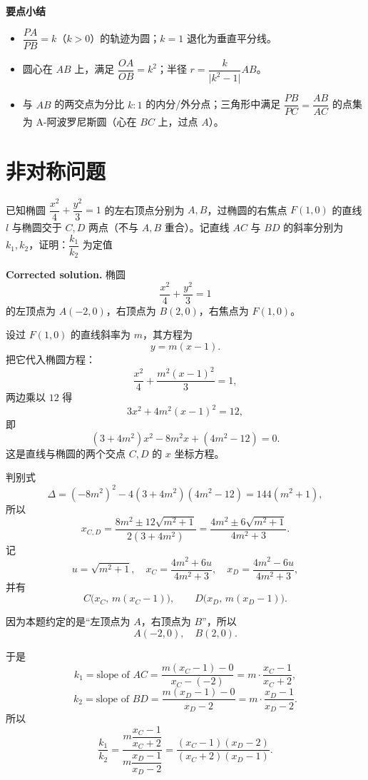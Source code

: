 \documentclass{article}
\begin{document}
   \textbf{要点小结}
   \begin{itemize}
   	\item \(\dfrac{PA}{PB}=k\)（\(k>0\)）的轨迹为圆；\(k=1\) 退化为垂直平分线。
   	\item 圆心在 \(AB\) 上，满足 \(\dfrac{OA}{OB}=k^2\)；半径 \(r=\dfrac{k}{\lvert k^2-1\rvert}AB\)。
   	\item 与 \(AB\) 的两交点为分比 \(k:1\) 的内分/外分点；三角形中满足 \(\dfrac{PB}{PC}=\dfrac{AB}{AC}\) 的点集为 A-阿波罗尼斯圆（心在 \(BC\) 上，过点 \(A\)）。
   \end{itemize}
   
   \section{非对称问题}
   
   已知椭圆 \(\dfrac{x^{2}}{4}+\dfrac{y^{2}}{3}=1\) 的左右顶点分别为 \(A,B\)，过椭圆的右焦点 \(F(1,0)\) 的直线 \(l\) 与椭圆交于 \(C,D\) 两点（不与 \(A,B\) 重合）。记直线 \(AC\) 与 \(BD\) 的斜率分别为 \(k_{1},k_{2}\)，证明：\(\dfrac{k_{1}}{k_{2}}\) 为定值
   
   \textbf{Corrected solution.}
   椭圆
   \[
   \frac{x^{2}}{4}+\frac{y^{2}}{3}=1
   \]
   的左顶点为 \(A(-2,0)\)，右顶点为 \(B(2,0)\)，右焦点为 \(F(1,0)\)。
   
   设过 \(F(1,0)\) 的直线斜率为 \(m\)，其方程为
   \[
   y = m(x-1).
   \]
   把它代入椭圆方程：
   \[
   \frac{x^{2}}{4} + \frac{m^{2}(x-1)^{2}}{3} = 1,
   \]
   两边乘以 \(12\) 得
   \[
   3x^{2} + 4m^{2}(x-1)^{2} = 12,
   \]
   即
   \[
   (3+4m^{2})x^{2} - 8m^{2}x + (4m^{2}-12) = 0. \tag{1}
   \]
   这是直线与椭圆的两个交点 \(C,D\) 的 \(x\) 坐标方程。
   
   判别式
   \[
   \Delta = (-8m^{2})^{2} - 4(3+4m^{2})(4m^{2}-12)
   = 144(m^{2}+1),
   \]
   所以
   \[
   x_{C,D}
   = \frac{8m^{2} \pm 12\sqrt{m^{2}+1}}{2(3+4m^{2})}
   = \frac{4m^{2} \pm 6\sqrt{m^{2}+1}}{4m^{2}+3}.
   \]
   记
   \[
   u = \sqrt{m^{2}+1}, \quad
   x_C = \frac{4m^{2}+6u}{4m^{2}+3}, \quad
   x_D = \frac{4m^{2}-6u}{4m^{2}+3},
   \]
   并有
   \[
   C\bigl(x_C,\, m(x_C-1)\bigr), \qquad
   D\bigl(x_D,\, m(x_D-1)\bigr).
   \]
   
   因为本题约定的是“左顶点为 \(A\)，右顶点为 \(B\)”，所以
   \[
   A(-2,0), \quad B(2,0).
   \]
   
   于是
   \[
   k_1 = \text{slope of } AC
   = \frac{m(x_C-1)-0}{x_C - (-2)}
   = m \cdot \frac{x_C - 1}{x_C + 2},
   \]
   \[
   k_2 = \text{slope of } BD
   = \frac{m(x_D-1)-0}{x_D - 2}
   = m \cdot \frac{x_D - 1}{x_D - 2}.
   \]
   所以
   \[
   \frac{k_1}{k_2}
   = \frac{m \dfrac{x_C - 1}{x_C + 2}}{m \dfrac{x_D - 1}{x_D - 2}}
   = \frac{(x_C - 1)(x_D - 2)}{(x_C + 2)(x_D - 1)}. \tag{2}
   \]
   
\end{document}
